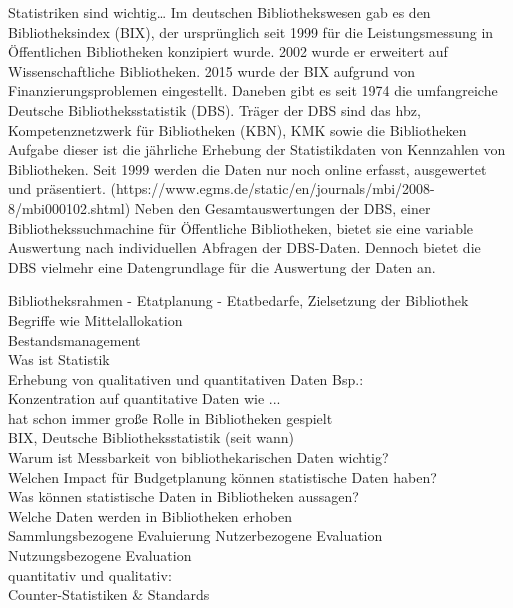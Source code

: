 Statistriken sind wichtig…
Im deutschen Bibliothekswesen gab es den Bibliotheksindex (BIX), der ursprünglich seit 1999 für die Leistungsmessung in Öffentlichen Bibliotheken konzipiert wurde. 2002 wurde er erweitert auf Wissenschaftliche Bibliotheken. 2015 wurde der BIX aufgrund von Finanzierungsproblemen eingestellt. Daneben gibt es seit 1974 die umfangreiche Deutsche Bibliotheksstatistik (DBS). Träger der DBS sind das hbz, Kompetenznetzwerk für Bibliotheken (KBN), KMK sowie die Bibliotheken
Aufgabe dieser ist die jährliche Erhebung der Statistikdaten von Kennzahlen von Bibliotheken.  Seit 1999 werden die Daten nur noch online erfasst, ausgewertet und präsentiert. 
(https://www.egms.de/static/en/journals/mbi/2008-8/mbi000102.shtml)
Neben den Gesamtauswertungen der DBS, einer Bibliothekssuchmachine für Öffentliche Bibliotheken, bietet sie eine variable Auswertung nach individuellen Abfragen der DBS-Daten. Dennoch bietet die DBS vielmehr eine Datengrundlage für die Auswertung der Daten an.



\clearpage
Bibliotheksrahmen - Etatplanung - Etatbedarfe, Zielsetzung der Bibliothek\\
Begriffe wie Mittelallokation\\
Bestandsmanagement\\
Was ist Statistik\\
Erhebung von qualitativen und quantitativen Daten Bsp.:\\
Konzentration auf quantitative Daten wie ...\\
hat schon immer große Rolle in Bibliotheken gespielt\\
BIX, Deutsche Bibliotheksstatistik (seit wann)\\
Warum ist Messbarkeit von bibliothekarischen Daten wichtig?\\
Welchen Impact für Budgetplanung können statistische Daten haben?\\
Was können statistische Daten in Bibliotheken aussagen?\\
Welche Daten werden in Bibliotheken erhoben\\
Sammlungsbezogene Evaluierung
Nutzerbezogene Evaluation\\
Nutzungsbezogene Evaluation\\
quantitativ und qualitativ:\\
Counter-Statistiken \& Standards\\

\clearpage

